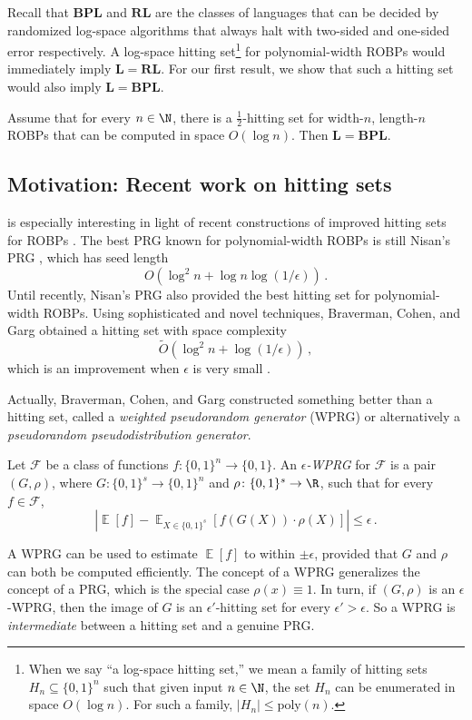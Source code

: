 \documentclass{toc}
\DeclareMathOperator*{\ExpVal}{\mathbb{E}}
\begin{document}
Recall that $\mathbf{BPL}$ and $\mathbf{RL}$ are the classes of languages that can be decided by randomized log-space algorithms that always halt with two-sided and one-sided error respectively. A log-space hitting set\footnote{When we say ``a log-space hitting set,'' we mean a family of hitting sets $H_n \subseteq \{0, 1\}^n$ such that given input $n \in \N$, the set $H_n$ can be enumerated in space $O(\log n)$. For such a family, $|H_n| \leq \text{poly}(n)$.} for polynomial-width ROBPs would immediately imply $\mathbf{L} = \mathbf{RL}$. For our first result, we show that such a hitting set would also imply $\mathbf{L}= \mathbf{BPL}$.

\begin{theorem} \label{thm:poly-width-main}
Assume that for every $n \in \N$, there is a $\frac{1}{2}$-hitting set for width-$n$, length-$n$ ROBPs that can be computed in space $O(\log n)$. Then $\mathbf{L} = \mathbf{BPL}$.
\end{theorem}

\subsection{Motivation: Recent work on hitting sets}

 is especially interesting in light of recent constructions of improved hitting sets for ROBPs \cite{BCG20, HZ20, CL20}. The best PRG known for polynomial-width ROBPs is still Nisan's PRG \cite{Nis92}, which has seed length
$$
O(\log^2 n + \log n \log(1/\epsilon))\,.
$$
Until recently, Nisan's PRG also provided the best hitting set for polynomial-width ROBPs. Using sophisticated and novel techniques, Braverman, Cohen, and Garg obtained a hitting set with space complexity
$$
\widetilde{O}(\log^2 n + \log(1/\epsilon))\,,
$$
which is an improvement when $\epsilon$ is very small \cite{BCG20}.

Actually, Braverman, Cohen, and Garg constructed something better than a hitting set, called a \emph{weighted pseudorandom generator} (WPRG) or alternatively a \emph{pseudorandom pseudodistribution generator}.
\begin{definition}
Let $\mathcal{F}$ be a class of functions $f \colon \{0, 1\}^n \to \{0, 1\}$. An \emph{$\epsilon$-WPRG} for $\mathcal{F}$ is a pair $(G, \rho)$, where $G \colon \{0, 1\}^s \to \{0, 1\}^n$ and $\rho \colon \{0, 1\}^s \to \R$, such that for every $f \in \mathcal{F}$,
\[
\left|\ExpVal[f] - \ExpVal_{X \in \{0, 1\}^s}[f(G(X)) \cdot \rho(X)]\right| \leq \epsilon\,.
\]
\end{definition}
A WPRG can be used to estimate $\ExpVal[f]$ to within $\pm \epsilon$, provided that $G$ and $\rho$ can both be computed efficiently. The concept of a WPRG generalizes the concept of a PRG, which is the special case $\rho(x) \equiv 1$. 
In turn, if $(G, \rho)$ is an $\epsilon$-WPRG, then the image of $G$ is an $\epsilon'$-hitting set for every $\epsilon' > \epsilon$. So a WPRG is \emph{intermediate} between a hitting set and a genuine PRG.
\end{document}
